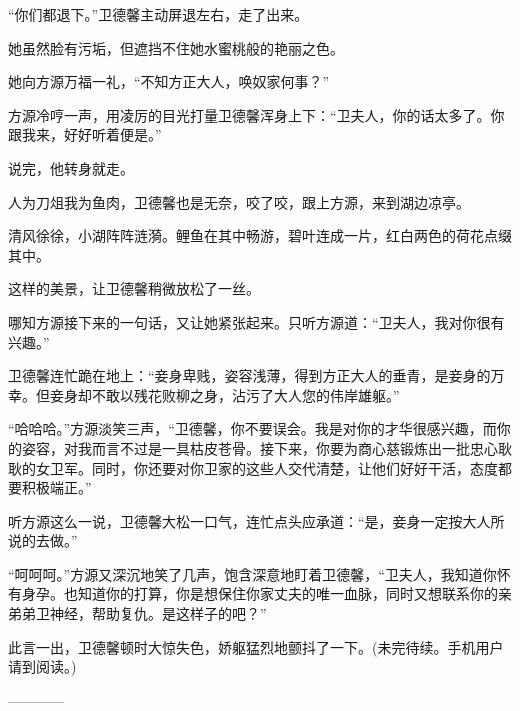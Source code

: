 \begin{this_body}
“你们都退下。”卫德馨主动屏退左右，走了出来。

她虽然脸有污垢，但遮挡不住她水蜜桃般的艳丽之色。

她向方源万福一礼，“不知方正大人，唤奴家何事？”

方源冷哼一声，用凌厉的目光打量卫德馨浑身上下：“卫夫人，你的话太多了。你跟我来，好好听着便是。”

说完，他转身就走。

人为刀俎我为鱼肉，卫德馨也是无奈，咬了咬，跟上方源，来到湖边凉亭。

清风徐徐，小湖阵阵涟漪。鲤鱼在其中畅游，碧叶连成一片，红白两色的荷花点缀其中。

这样的美景，让卫德馨稍微放松了一丝。

哪知方源接下来的一句话，又让她紧张起来。只听方源道：“卫夫人，我对你很有兴趣。”

卫德馨连忙跪在地上：“妾身卑贱，姿容浅薄，得到方正大人的垂青，是妾身的万幸。但妾身却不敢以残花败柳之身，沾污了大人您的伟岸雄躯。”

“哈哈哈。”方源淡笑三声，“卫德馨，你不要误会。我是对你的才华很感兴趣，而你的姿容，对我而言不过是一具枯皮苍骨。接下来，你要为商心慈锻炼出一批忠心耿耿的女卫军。同时，你还要对你卫家的这些人交代清楚，让他们好好干活，态度都要积极端正。”

听方源这么一说，卫德馨大松一口气，连忙点头应承道：“是，妾身一定按大人所说的去做。”

“呵呵呵。”方源又深沉地笑了几声，饱含深意地盯着卫德馨，“卫夫人，我知道你怀有身孕。也知道你的打算，你是想保住你家丈夫的唯一血脉，同时又想联系你的亲弟弟卫神经，帮助复仇。是这样子的吧？”

此言一出，卫德馨顿时大惊失色，娇躯猛烈地颤抖了一下。(未完待续。手机用户请到阅读。)

------------

\end{this_body}

